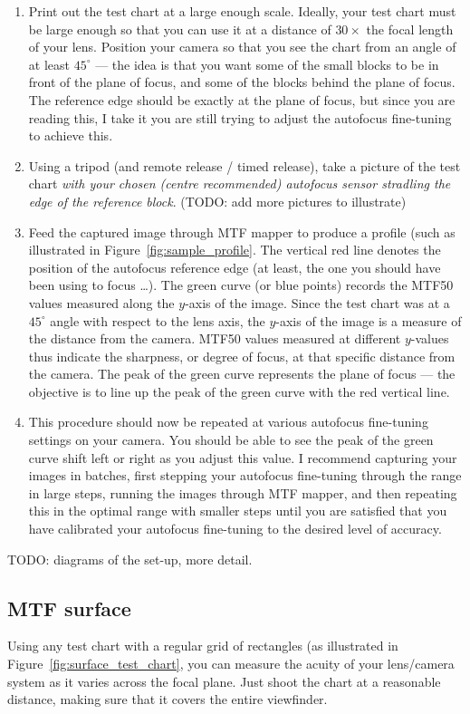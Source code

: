\documentclass[a4paper]{article}
\begin{document}
\begin{enumerate}
    \item Print out the test chart at a large enough scale. Ideally, your
test chart must be large enough so that you can use it at a distance of
$30\times$ the focal length of your lens. Position your camera so that you
see the chart from an angle of at least $45^\circ$ --- the idea is that you
want some of the small blocks to be in front of the plane of focus, and some
of the blocks behind the plane of focus. The reference edge should be
exactly at the plane of focus, but since you are reading this, I take it you
are still trying to adjust the autofocus fine-tuning to achieve this.
    \item Using a tripod (and remote release / timed release), take a
picture of the test chart \emph{with your chosen (centre recommended)
autofocus sensor stradling the edge of the reference block}. (TODO: add more
pictures to illustrate)
    \item Feed the captured image through MTF mapper to produce a profile
(such as illustrated in Figure~\ref{fig:sample_profile}. The vertical red
line denotes the position of the autofocus reference edge (at least, the one
you should have been using to focus \ldots). The green curve (or blue
points) records the MTF50 values measured along the $y$-axis of the image.
Since the test chart was at a $45^\circ$ angle with respect to the lens
axis, the $y$-axis of the image is a measure of the distance from the
camera. MTF50 values measured at different $y$-values thus indicate the
sharpness, or degree of focus, at that specific distance from the camera.
The peak of the green curve represents the plane of focus --- the objective
is to line up the peak of the green curve with the red vertical line.
    \item This procedure should now be repeated at various autofocus
fine-tuning settings on your camera. You should be able to see the peak of
the green curve shift left or right as you adjust this value. I recommend
capturing your images in batches, first stepping your autofocus fine-tuning
through the range in large steps, running the images through MTF mapper, and
then repeating this in the optimal range with smaller steps until you are
satisfied that you have calibrated your autofocus fine-tuning to the desired
level of accuracy.
\end{enumerate}

TODO: diagrams of the set-up, more detail.


\subsection{MTF surface}
Using any test chart with a regular grid of rectangles (as illustrated in
Figure~\ref{fig:surface_test_chart}, you can measure the acuity of your
lens/camera system as it varies across the focal plane. Just shoot the chart
at a reasonable distance, making sure that it covers the entire viewfinder.
\end{document}
